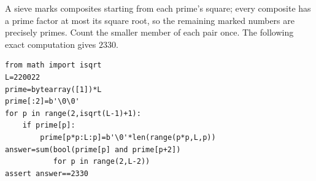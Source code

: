 A sieve marks composites starting from each prime's square; every composite has a prime factor at most its square root, so the remaining marked numbers are precisely primes. Count the smaller member of each pair once. The following exact computation gives $\boxed{2330}$.
\begin{verbatim}
from math import isqrt
L=220022
prime=bytearray([1])*L
prime[:2]=b'\0\0'
for p in range(2,isqrt(L-1)+1):
    if prime[p]:
        prime[p*p:L:p]=b'\0'*len(range(p*p,L,p))
answer=sum(bool(prime[p] and prime[p+2])
           for p in range(2,L-2))
assert answer==2330
\end{verbatim}

